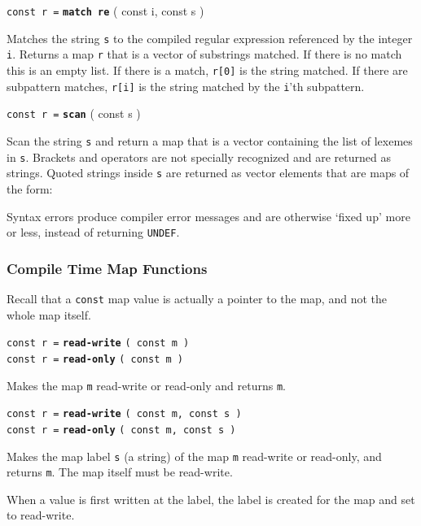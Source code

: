 \documentclass[12pt]{article}
\newcommand{\ttkey}[1]{{\tt \bfseries #1}}
\newenvironment{indpar}[1][0.3in]%
	{\begin{list}{}%
		     {\setlength{\itemsep}{0in}%
		      \setlength{\topsep}{0in}%
		      \setlength{\parsep}{1ex}%
		      \setlength{\labelwidth}{#1}%
		      \setlength{\leftmargin}{#1}%
		      \addtolength{\leftmargin}{\labelsep}}%
	 \item}%
	{\end{list}}
\begin{document}
{\tt const r =} \ttkey{match re} ( const i, const s  )
\begin{indpar}
Matches the string {\tt s} to the compiled regular expression
referenced by the integer {\tt i}.
Returns a map {\tt r} that is a vector of substrings matched.
If there is no match this is an empty list.  If there is
a match, {\tt r[0]} is the string matched.  If there are
subpattern matches, {\tt r[i]} is the string matched by the
{\tt i}'th subpattern.
\end{indpar}

{\tt const r =} \ttkey{scan} ( const s  )
\begin{indpar}
Scan the string {\tt s} and return a map that is a vector
containing the list of lexemes in {\tt s}.  Brackets and
operators are not specially recognized and are returned
as strings.  Quoted strings inside {\tt s} are returned
as vector elements that are maps of the form: \\

Syntax errors produce compiler error messages and are
otherwise `fixed up' more or less, instead of returning {\tt UNDEF}.
\end{indpar}

\subsubsection{Compile Time Map Functions}

Recall that a {\tt const} map value is actually a pointer to the map,
and not the whole map itself.

{\tt const r =} \ttkey{read-write} {\tt ( const m )} \\
{\tt const r =} \ttkey{read-only} {\tt ( const m )}
\begin{indpar}
Makes the map {\tt m} read-write or read-only and returns {\tt m}.
\end{indpar}

{\tt const r =} \ttkey{read-write} {\tt ( const m, const s )} \\
{\tt const r =} \ttkey{read-only} {\tt ( const m, const s )} %
\label{READ-ONLY-DICTIONARY-FUNCTION}
\begin{indpar}
Makes the map label {\tt s} (a string) of the map {\tt m}
read-write or read-only, and returns {\tt m}.  The map
itself must be read-write.

When a value is first written at the label, the label is created
for the map and set to read-write.
\end{indpar}
\end{document}
